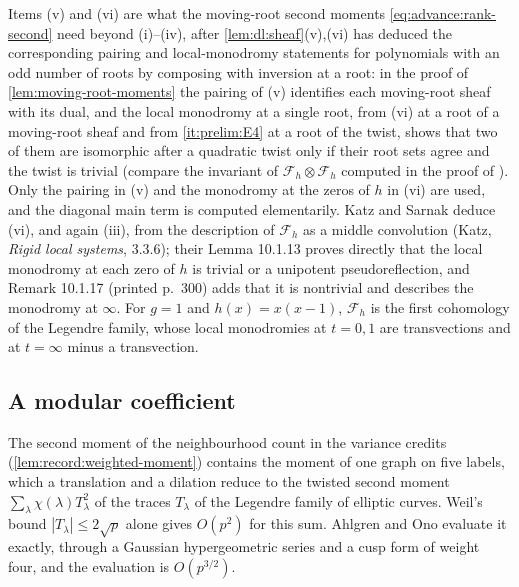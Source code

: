 Items (v) and (vi) are what the moving-root second moments
\eqref{eq:advance:rank-second} need beyond (i)--(iv), after
\cref{lem:dl:sheaf}(v),(vi) has deduced the corresponding pairing and local-monodromy statements for polynomials with an odd number of roots by composing with inversion at a root: in the proof of \cref{lem:moving-root-moments} the
pairing of (v) identifies each moving-root sheaf with its dual, and the local
monodromy at a single root, from (vi) at a root of a moving-root sheaf and
from \ref{it:prelim:E4} at a root of the twist, shows that two of them are
isomorphic after a quadratic twist only if their root sets agree and the twist
is trivial (compare the invariant of $\mathcal F_h\otimes\mathcal F_h$
computed in the proof of \cite[Lemma~10.1.15]{KatzSarnak}). Only the pairing
in (v) and the monodromy at the zeros of $h$ in (vi) are used, and the
diagonal main term is computed elementarily. Katz and Sarnak deduce (vi), and
again (iii), from the description of $\mathcal F_h$ as a middle convolution (Katz,
\emph{Rigid local systems}, 3.3.6); their Lemma 10.1.13 proves directly that
the local monodromy at each zero of $h$ is trivial or a unipotent
pseudoreflection, and Remark 10.1.17 (printed p.~300) adds that it is
nontrivial and describes the monodromy at $\infty$. For $g=1$ and
$h(x)=x(x-1)$, $\mathcal F_h$ is the first cohomology of the Legendre family,
whose local monodromies at $t=0,1$ are transvections and at $t=\infty$ minus
a transvection.

\subsection{A modular coefficient}\label{subsec:external:modular}

The second moment of the neighbourhood count in the variance credits
(\cref{lem:record:weighted-moment}) contains the moment of one graph on five
labels, which a translation and a dilation reduce to the twisted second moment
$\sum_\lambda\chi(\lambda)T_\lambda^2$ of the traces $T_\lambda$ of the Legendre
family of elliptic curves. Weil's bound $|T_\lambda|\le2\sqrt p$ alone gives
$O(p^2)$ for this sum. Ahlgren and Ono evaluate it exactly, through a Gaussian
hypergeometric series and a cusp form of weight four, and the evaluation is
$O(p^{3/2})$.

